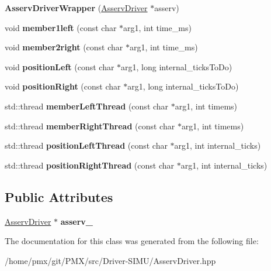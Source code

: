 \begin{DoxyCompactItemize}
\item 
\mbox{\label{classAsservDriverWrapper_ac9cdc2a725579a0e67e3e5d70fea98ff}} 
{\bfseries Asserv\+Driver\+Wrapper} (\hyperlink{classAsservDriver}{Asserv\+Driver} $\ast$asserv)
\item 
\mbox{\label{classAsservDriverWrapper_a4d3b337fd6beed104ba60b69213344cc}} 
void {\bfseries member1left} (const char $\ast$arg1, int time\+\_\+ms)
\item 
\mbox{\label{classAsservDriverWrapper_af356c1725a4b8dac9994dd0d94e12069}} 
void {\bfseries member2right} (const char $\ast$arg1, int time\+\_\+ms)
\item 
\mbox{\label{classAsservDriverWrapper_aad45be064ecfd5eed9c687875f0e92e5}} 
void {\bfseries position\+Left} (const char $\ast$arg1, long internal\+\_\+ticks\+To\+Do)
\item 
\mbox{\label{classAsservDriverWrapper_a4642069f82e26bf54045931a819a4d84}} 
void {\bfseries position\+Right} (const char $\ast$arg1, long internal\+\_\+ticks\+To\+Do)
\item 
\mbox{\label{classAsservDriverWrapper_a6d2ba86845397e2a65e62660f7d94710}} 
std\+::thread {\bfseries member\+Left\+Thread} (const char $\ast$arg1, int timems)
\item 
\mbox{\label{classAsservDriverWrapper_af629788681c4e3155c9fc56d6a783d8a}} 
std\+::thread {\bfseries member\+Right\+Thread} (const char $\ast$arg1, int timems)
\item 
\mbox{\label{classAsservDriverWrapper_a8c951da2eafa9448971f7f68088edec8}} 
std\+::thread {\bfseries position\+Left\+Thread} (const char $\ast$arg1, int internal\+\_\+ticks)
\item 
\mbox{\label{classAsservDriverWrapper_a0851aa582a82bf4cf9de2dcf240d585e}} 
std\+::thread {\bfseries position\+Right\+Thread} (const char $\ast$arg1, int internal\+\_\+ticks)
\end{DoxyCompactItemize}
\subsection*{Public Attributes}
\begin{DoxyCompactItemize}
\item 
\mbox{\label{classAsservDriverWrapper_abf6d7798ba8a1ae877c053edaf3f1d6a}} 
\hyperlink{classAsservDriver}{Asserv\+Driver} $\ast$ {\bfseries asserv\+\_\+}
\end{DoxyCompactItemize}


The documentation for this class was generated from the following file\+:\begin{DoxyCompactItemize}
\item 
/home/pmx/git/\+P\+M\+X/src/\+Driver-\/\+S\+I\+M\+U/Asserv\+Driver.\+hpp\end{DoxyCompactItemize}
